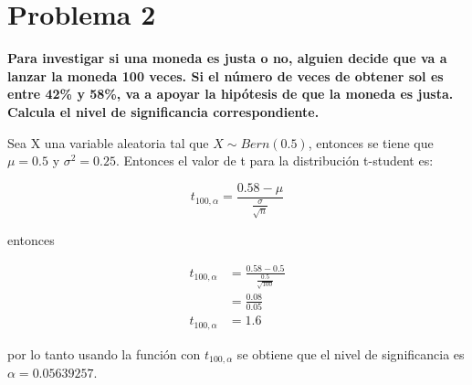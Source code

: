\section*{Problema 2}

\textbf{Para investigar si una moneda es justa o no, alguien decide que va a lanzar la moneda 100 veces. Si el número de veces de obtener sol es entre 42\% y 58\%, va a apoyar la hipótesis de que la moneda es justa. Calcula el nivel de significancia correspondiente.}


Sea X una variable aleatoria tal que $X\sim Bern(0.5)$, entonces se tiene que $\mu=0.5$ y $\sigma^2 = 0.25$. Entonces el valor de  t para la distribución t-student es:

\begin{equation*}
    t_{100,\alpha} = \frac{0.58-\mu}{\frac{\sigma}{\sqrt{n}}}
\end{equation*}

entonces

\begin{align*}
    t_{100,\alpha} & = \frac{0.58-0.5}{\frac{0.5}{\sqrt{100}}} \\
                   & = \frac{0.08}{0.05}                       \\
    t_{100,\alpha} & = 1.6
\end{align*}

por lo tanto usando la función  con $t_{100,\alpha}$ se obtiene que el nivel de significancia es $\alpha=0.05639257$.